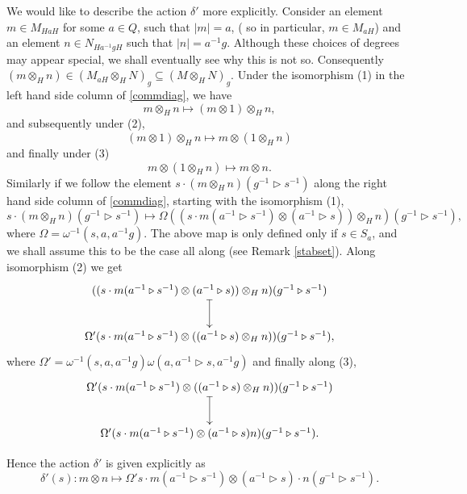\documentclass[a4paper, 10pt]{book}
\theoremstyle{definition}
\numberwithin{equation}{chapter}
\newcommand\hit{\triangleright}
\newcommand\inv{^{-1}}
\newcommand\ot{\otimes}
\begin{document}
We would like to describe the action $\delta'$ more explicitly. Consider  an element $m\in M_{HaH}$ for some $a\in Q$, such that $|m| = a$, ( so in particular, $m\in M_{aH}$) and an element $n\in N_{Ha\inv g H}$ such that $|n| = a\inv g$. Although these choices of degrees may appear special, we shall eventually see why this is not so. Consequently $ (m\otimes_H n) \in (M_{aH}\otimes_H N)_g \subseteq (M\otimes_H N)_g$.
Under the isomorphism (1) in the left hand side column of \eqref{commdiag}, we have \begin{equation*}
	m\ot_H n \mapsto (m\ot 1)\ot_H n,
\end{equation*} and subsequently under (2), 
\begin{equation*}
	(m\ot 1)\ot_H n \mapsto m\ot(1\ot_H n)	
\end{equation*} and finally under (3)
\begin{equation*}
	m\ot(1\ot_Hn)\mapsto m\ot n.
\end{equation*}
Similarly if we follow the element $s\cdot (m\ot_H n)(g\inv \hit s\inv)$ along the right hand side column of \eqref{commdiag}, starting with the isomorphism (1), \begin{equation*}
	s\cdot(m\ot_H n)(g\inv \hit s\inv)\mapsto \Omega((s\cdot m(a\inv \hit s\inv)\ot (a\inv\hit s))\ot_H n)(g\inv\hit s\inv),
\end{equation*} where $\Omega = \omega\inv (s, a, a\inv g)$. The above map is only defined only if $s\in S_a$, and we shall assume this to be the case all along (see Remark \ref{stabset}). Along isomorphism (2) we get 
\begin{equation*}
	\xymatrix{((s\cdot m(a\inv \hit s\inv)\ot (a\inv\hit s))\ot_H n)(g\inv\hit s\inv) \ar@{|->}[d]\\ \Omega'(s\cdot m(a\inv \hit s\inv)\ot ((a\inv\hit s)\ot_H n))(g\inv\hit s\inv),}
\end{equation*} where $\Omega' = \omega\inv (s, a, a\inv g)\omega (a, a\inv\hit s, a\inv g)$ and finally along (3),
\begin{equation*}
	\xymatrix{ \Omega'(s\cdot m(a\inv \hit s\inv)\ot ((a\inv\hit s)\ot_H n))(g\inv\hit s\inv) \ar@{|->}[d]\\ \Omega'(s\cdot m(a\inv \hit s\inv)\ot (a\inv\hit s) n)(g\inv\hit s\inv). }
\end{equation*}

Hence the action $\delta'$ is given explicitly as \begin{equation*}
	\delta'(s): m\ot n \mapsto \Omega's\cdot m(a\inv \hit s\inv)\ot (a\inv\hit s)\cdot n(g\inv\hit s\inv).
\end{equation*}
\end{document}
